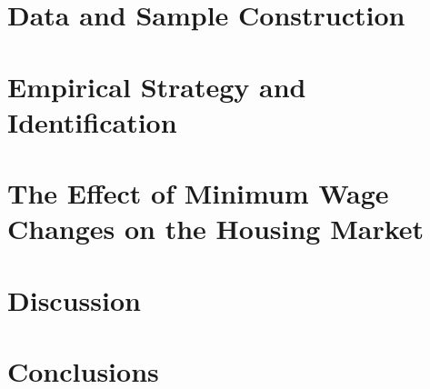 \documentclass{article}
\begin{document}
\section{Data and Sample Construction}\label{sec:data}
	

\section{Empirical Strategy and Identification}\label{sec:empirical_strategy}
    

\section{The Effect of Minimum Wage Changes on the Housing Market}\label{sec:results}
    

\section{Discussion}\label{sec:discussion}
	

\section{Conclusions}\label{sec:conclusion}
    



\clearpage
\printbibliography


\clearpage

\section*{}
\vspace{5mm}

\appendix

\renewcommand\thetable{\thesection.\arabic{table}}    
\renewcommand\thefigure{\thesection.\arabic{figure}} 
\setcounter{table}{0}
\setcounter{figure}{0}


\end{document}
